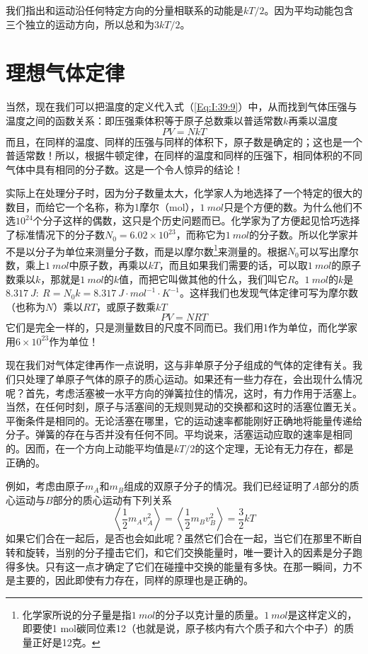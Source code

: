 我们指出和运动沿任何特定方向的分量相联系的动能是$kT/2$。因为平均动能包含三个独立的运动方向，所以总和为$3kT/2$。

\section{理想气体定律}

当然，现在我们可以把温度的定义代入式（\ref{Eq:I:39:9}）中，从而找到气体压强与温度之间的函数关系：即压强乘体积等于原子总数乘以普适常数$k$再乘以温度
\begin{equation}
    \label{Eq:I:39:22}
    PV = NkT
\end{equation}
而且，在同样的温度、同样的压强与同样的体积下，原子数是确定的；这也是一个普适常数！所以，根据牛顿定律，在同样的温度和同样的压强下，相同体积的不同气体中具有相同的分子数。这是一个令人惊异的结论！

实际上在处理分子时，因为分子数量太大，化学家人为地选择了一个特定的很大的数目，而给它一个名称，称为1摩尔（mol），$1~mol$只是个方便的数。为什么他们不选$10^24$个分子这样的偶数，这只是个历史问题而已。化学家为了方便起见恰巧选择了标准情况下的分子数$N_0=6.02\times 10^{23}$，而称它为$1~mol$的分子数。所以化学家并不是以分子为单位来测量分子数，而是以摩尔数\footnote{化学家所说的分子量是指$1~mol$的分子以克计量的质量。$1~mol$是这样定义的，即要使1 mol碳同位素12（也就是说，原子核内有六个质子和六个中子）的质量正好是12克。}来测量的。根据$N_0$可以写出摩尔数，乘上$1~mol$中原子数，再乘以$kT$，而且如果我们需要的话，可以取$1~mol$的原子数乘以$k$，那就是$1~mol$的$k$值，而把它叫做其他的什么，我们叫它$R$。$1~mol$的$k$是$8.317~J:~R=N_0k=8.317~J\cdot mol^{-1}\cdot K^{-1}$。这样我们也发现气体定律可写为摩尔数（也称为$N$）乘以$RT$，或原子数乘$kT$
\begin{equation}
    \label{Eq:I:39:23}
    PV = NRT
\end{equation}
它们是完全一样的，只是测量数目的尺度不同而已。我们用1作为单位，而化学家用$6\times 10^{23}$作为单位！

现在我们对气体定律再作一点说明，这与非单原子分子组成的气体的定律有关。我们只处理了单原子气体的原子的质心运动。如果还有一些力存在，会出现什么情况呢？首先，考虑活塞被一水平方向的弹簧拉住的情况，这时，有力作用于活塞上。当然，在任何时刻，原子与活塞间的无规则晃动的交换都和这时的活塞位置无关。平衡条件是相同的。无论活塞在哪里，它的运动速率都能刚好正确地将能量传递给分子。弹簧的存在与否并没有任何不同。平均说来，活塞运动应取的速率是相同的。因而，在一个方向上动能平均值是$kT/2$的这个定理，无论有无力存在，都是正确的。

例如，考虑由原子$m_A$和$m_B$组成的双原子分子的情况。我们已经证明了$A$部分的质心运动与$B$部分的质心运动有下列关系
\begin{equation*}
    \left \langle \frac{1}{2}m_Av_A^2 \right \rangle = \left \langle \frac{1}{2}m_Bv_B^2 \right \rangle = \frac{3}{2}kT
\end{equation*}
如果它们合在一起后，是否也会如此呢？虽然它们合在一起，当它们在那里不断自转和旋转，当别的分子撞击它们，和它们交换能量时，唯一要计入的因素是分子跑得多快。只有这一点才确定了它们在碰撞中交换的能量有多快。在那一瞬间，力不是主要的，因此即使有力存在，同样的原理也是正确的。

